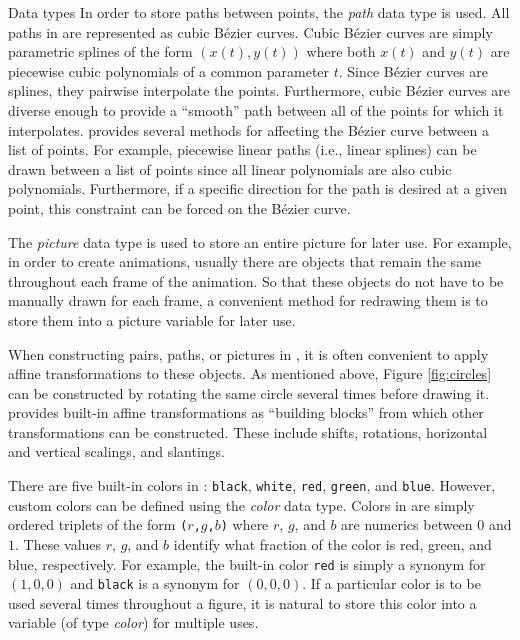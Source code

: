 \begin{section}{Data types}
In order to store paths between points, the \textit{path} data type is used.  All paths in \MP{} are represented as cubic B\'{e}zier curves.  Cubic B\'{e}zier curves are simply parametric splines of the form $(x(t),y(t))$ where both $x(t)$ and $y(t)$ are piecewise cubic polynomials of a common parameter $t$.  Since B\'{e}zier curves are splines, they pairwise interpolate the points.  Furthermore, cubic B\'{e}zier curves are diverse enough to provide a ``smooth'' path between all of the points for which it interpolates.  \MP{} provides several methods for affecting the B\'{e}zier curve between a list of points.  For example, piecewise linear paths (i.e., linear splines) can be drawn between a list of points since all linear polynomials are also cubic polynomials.  Furthermore, if a specific direction for the path is desired at a given point, this constraint can be forced on the B\'{e}zier curve.

The \textit{picture} data type is used to store an entire picture for later use.  For example, in order to create animations, usually there are objects that remain the same throughout each frame of the animation.  So that these objects do not have to be manually drawn for each frame, a convenient method for redrawing them is to store them into a picture variable for later use.

When constructing pairs, paths, or pictures in \MP{}, it is often convenient to apply affine transformations to these objects.  As mentioned above, Figure \ref{fig:circles} can be constructed by rotating the same circle several times before drawing it.  \MP{} provides built-in affine transformations as ``building blocks'' from which other transformations can be constructed.  These include shifts, rotations, horizontal and vertical scalings, and slantings.

There are five built-in colors in \MP{}: \texttt{black}, \texttt{white}, \texttt{red}, \texttt{green}, and \texttt{blue}.  However, custom colors can be defined using the \textit{color} data type.  Colors in \MP{} are simply ordered triplets of the form \texttt{(}$r$\texttt{,}$g$\texttt{,}$b$\texttt{)} where $r$, $g$, and $b$ are numerics between $0$ and $1$.  These values $r$, $g$, and $b$ identify what fraction of the color is red, green, and blue, respectively.  For example, the built-in color \texttt{red} is simply a synonym for $(1,0,0)$ and \texttt{black} is a synonym for $(0,0,0)$.  If a particular color is to be used several times throughout a figure, it is natural to store this color into a variable (of type \textit{color}) for multiple uses.


\end{section}
